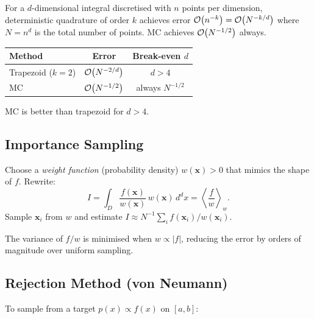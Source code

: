 For a $d$-dimensional integral discretised with $n$ points per
dimension, deterministic quadrature of order $k$ achieves error
$\mathcal{O}\!\left(n^{-k}\right) = \mathcal{O}\!\left(N^{-k/d}\right)$ where $N=n^d$ is the total number
of points.  MC achieves $\mathcal{O}\!\left(N^{-1/2}\right)$ always.

\begin{center}
\begin{tabular}{lcc}
\toprule
Method & Error & Break-even $d$ \\
\midrule
Trapezoid ($k=2$) & $\mathcal{O}\!\left(N^{-2/d}\right)$ & $d>4$ \\
MC                & $\mathcal{O}\!\left(N^{-1/2}\right)$ & always $N^{-1/2}$ \\
\bottomrule
\end{tabular}
\end{center}

MC is better than trapezoid for $d > 4$.

\subsection{Importance Sampling}\label{subsec:lec21:importance}

Choose a \emph{weight function} (probability density) $w(\mathbf{x})>0$
that mimics the shape of $f$.  Rewrite:
\begin{equation}
  I = \int_D \frac{f(\mathbf{x})}{w(\mathbf{x})}\,w(\mathbf{x})\,d^d x
    = \left\langle \frac{f}{w} \right\rangle_w.
  \label{eq:lec21:importance}
\end{equation}
Sample $\mathbf{x}_i$ from $w$ and estimate
$I \approx N^{-1}\sum_i f(\mathbf{x}_i)/w(\mathbf{x}_i)$.

The variance of $f/w$ is minimised when $w \propto |f|$, reducing
the error by orders of magnitude over uniform sampling.


\subsection{Rejection Method (von Neumann)}\label{subsec:lec21:rejection}

To sample from a target $p(x) \propto f(x)$ on $[a,b]$:


